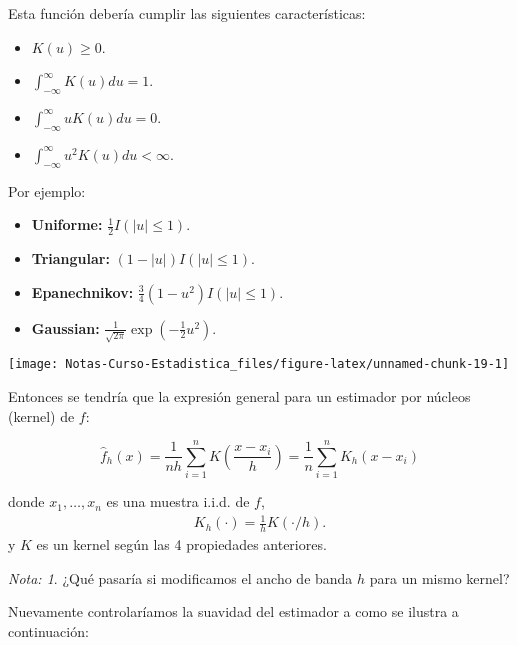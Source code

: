 \documentclass[
  12pt,
]{book}
\providecommand{\tightlist}{%
  \setlength{\itemsep}{0pt}\setlength{\parskip}{0pt}}
\theoremstyle{definition}
\theoremstyle{definition}
\theoremstyle{definition}
\theoremstyle{definition}
\theoremstyle{remark}
\newtheorem*{remark}{Nota: }
\begin{document}
Esta función debería cumplir las siguientes características:

\begin{itemize}
\tightlist
\item
  \(K(u)\geq 0\).
\item
  \(\int_{-\infty}^{\infty} K(u)du = 1\).
\item
  \(\int_{-\infty}^{\infty} u K(u)du = 0\).
\item
  \(\int_{-\infty}^{\infty} u^{2} K(u)du <\infty\).
\end{itemize}

Por ejemplo:

\begin{itemize}
\tightlist
\item
  \textbf{Uniforme:} \(\frac{1}{2} I \left( \left\vert u \right\vert \leq 1 \right)\).
\item
  \textbf{Triangular:} \((1-|u|) I \left( \left\vert u \right\vert \leq 1 \right)\).
\item
  \textbf{Epanechnikov:} \(\frac{3}{4} (1-u^{2}) I \left( \left\vert u \right\vert \leq 1 \right)\).
\item
  \textbf{Gaussian:} \(\frac{1}{\sqrt{2\pi}} \exp \left( -\frac{1}{2}u^{2} \right)\).
\end{itemize}

\begin{center}\texttt{[image: Notas-Curso-Estadistica\_files/figure-latex/unnamed-chunk-19-1]} \end{center}

Entonces se tendría que la expresión general para un estimador por núcleos (kernel) de \(f\):

\begin{equation*}
\hat{f}_{h}\left( x \right) = \frac{1}{nh}\sum_{i=1}^{n} K\left( \frac{x-x_{i}}{h} \right)=\frac{1}{n}\sum_{i=1}^{n} K_h(x-x_{i}) 
\end{equation*}

donde \(x_1,\ldots,x_n\) es una muestra i.i.d. de \(f\),
\begin{align*}
K_h(\cdot)=\frac 1 h K(\cdot /h).
\end{align*}
y \(K\) es un kernel según las 4 propiedades anteriores.

\begin{remark}
¿Qué pasaría si modificamos el ancho de banda \(h\) para un mismo kernel?
\end{remark}

Nuevamente controlaríamos la suavidad del estimador a como se ilustra a continuación:
\end{document}
